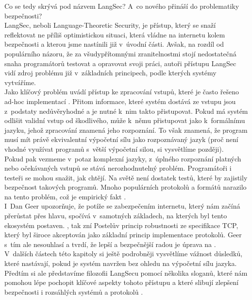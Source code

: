 Co se tedy skrývá pod názvem LangSec? A~co nového přináší do problematiky bezpečnosti? \\

LangSec, neboli Language-Theoretic Security, je přístup, který se snaží reflektovat ne příliš optimistickou situaci, která vládne na internetu kolem 
bezpečnosti a kterou jsme nastínili již v~úvodní části. Avšak, na rozdíl od populárního názoru, že za všudypřítomnými zranitelnostmi stojí 
nedostatečná snaha programátorů testovat a opravovat svoji práci, autoři přístupu LangSec vidí zdroj problému již v~základních principech, 
podle kterých systémy vytváříme. \\

Jako klíčový problém uvádí přístup ke zpracování vstupů, které je často řešeno ad-hoc implementací \cite{LangSecWeb}. Přitom informace, které systém
dostává ze vstupu jsou z~podstaty nedůvěryhodné a je nutné k~nim takto přistupovat. Pokud má systém odlišit validní vstup od škodlivého, může k~němu
přistupovat jako k~formálnímu jazyku, jehož zpracování znamená jeho rozpoznání. To však znamená, že program musí mít právě ekvivalentní výpočetní 
sílu jako rozpoznávaný jazyk (proč není vhodné využívat programů s~větší výpočetní silou, si vysvětlíme později). \\

Pokud pak vezmeme v~potaz komplexní jazyky, z~úplného rozpoznání platných nebo očekávaných vstupů se stává nerozhodnutelný problém. Programátoři 
i testeři se mohou snažit, jak chtějí. Na světě není dostatek testů, které by zajistily bezpečnost takových programů. Mnoho populárních protokolů 
a formátů narazilo na tento problém, což je empirický fakt \cite{LangSecWeb}. \\

I~Dan Geer \cite{Geer2010} upozorňuje, že potíže se zabezpečením internetu, který nám začíná přerůstat přes hlavu, spočívá v~samotných základech, 
na kterých byl tento ekosystém postaven. 
\textit{}, tak zní Postelův princip robustnosti ze specifikace TCP, 
který byl široce akceptován jako základní princip implementace protokolů.  Geer s~tím ale nesouhlasí a tvrdí, že lepší a bezpečnější radou je úprava 
na \textit{} \cite[str. 3]{Geer2010}. \\

V~dalších částech této kapitoly si ještě podrobněji vysvětlíme vážnost důsledků, které nastávají, pokud je systém navržen bez ohledu na výpočetní 
sílu jazyka. Předtím si ale představíme filozofii LangSecu pomocí několika sloganů, které nám pomohou lépe pochopit klíčové aspekty tohoto 
přístupu \cite{LangSecWeb} a které slibují zlepšení bezpečnosti i rozsáhlých systémů a protokolů \cite[str. 489]{Sass2013}. \\

